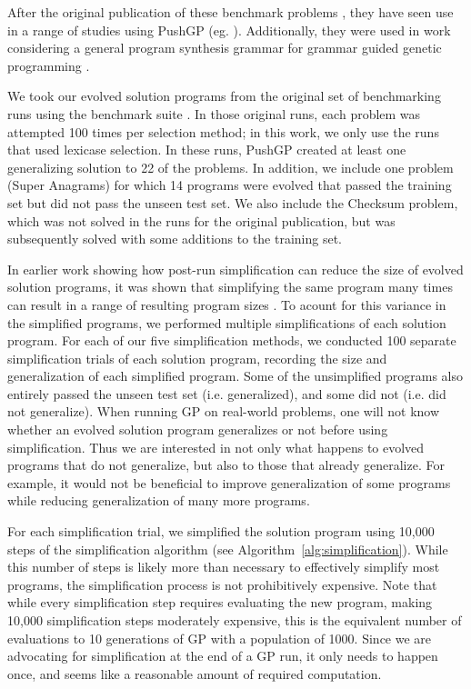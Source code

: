 After the original publication of these benchmark problems \cite{Helmuth:2015:GECCO}, they have seen use in a range of studies using PushGP (eg. \cite{Helmuth:2016:GECCO, McPhee:2016:GPTP, Helmuth:2015:GPTP, Helmuth:2015:dissertation}). Additionally, they were used in work considering a general program synthesis grammar for grammar guided genetic programming \cite{Forstenlechner:2017:eurogp}.

We took our evolved solution programs from the original set of benchmarking runs using the benchmark suite \cite{Helmuth:2015:GECCO}. In those original runs, each problem was attempted 100 times per selection method; in this work, we only use the runs that used lexicase selection. In these runs, PushGP created at least one generalizing solution to 22 of the problems. In addition, we include one problem (Super Anagrams) for which 14 programs were evolved that passed the training set but did not pass the unseen test set. We also include the Checksum problem, which was not solved in the runs for the original publication, but was subsequently solved with some additions to the training set.

In earlier work showing how post-run simplification can reduce the size of evolved solution programs, it was shown that simplifying the same program many times can result in a range of resulting program sizes \cite{Spector:2014:GECCOcomp}. To acount for this variance in the simplified programs, we performed multiple simplifications of each solution program. For each of our five simplification methods, we conducted 100 separate simplification trials of each solution program, recording the size and generalization of each simplified program. Some of the unsimplified programs also entirely passed the unseen test set (i.e. generalized), and some did not (i.e. did not generalize). When running GP on real-world problems, one will not know whether an evolved solution program generalizes or not before using simplification. Thus we are interested in not only what happens to evolved programs that do not generalize, but also to those that already generalize. For example, it would not be beneficial to improve generalization of some programs while reducing generalization of many more programs.

For each simplification trial, we simplified the solution program using 10,000 steps of the simplification algorithm (see Algorithm~\ref{alg:simplification}). While this number of steps is likely more than necessary to effectively simplify most programs, the simplification process is not prohibitively expensive. Note that while every simplification step requires evaluating the new program, making 10,000 simplification steps moderately expensive, this is the equivalent number of evaluations to 10 generations of GP with a population of 1000. Since we are advocating for simplification at the end of a GP run, it only needs to happen once, and seems like a reasonable amount of required computation.


